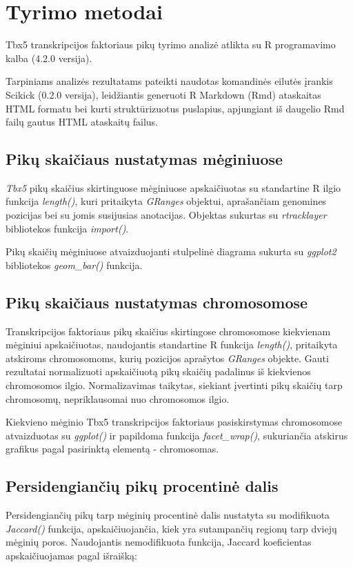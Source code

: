 \documentclass[12pt]{article}
\begin{document}

\section{Tyrimo metodai}
Tbx5 transkripcijos faktoriaus pikų tyrimo analizė atlikta su R programavimo
kalba\cite{R} (4.2.0 versija).

Tarpiniams analizės rezultatams pateikti naudotas komandinės eilutės įrankis
Scikick\cite{SCIK} (0.2.0 versija), leidžiantis generuoti R Markdown (Rmd)
ataskaitas HTML formatu bei kurti struktūrizuotus puslapius, apjungiant
iš daugelio Rmd failų gautus HTML ataskaitų failus.

\subsection{Pikų skaičiaus nustatymas mėginiuose}
\emph{Tbx5} pikų skaičius skirtinguose mėginiuose apskaičiuotas su
standartine R ilgio funkcija \emph{length()}, kuri pritaikyta \emph{GRanges}
objektui, aprašančiam genomines pozicijas bei su jomis susijusias anotacijas.
Objektas sukurtas su \emph{rtracklayer}\cite{R_TRACK} bibliotekos funkcija
\emph{import()}.

Pikų skaičių mėginiuose atvaizduojanti stulpelinė diagrama sukurta su
\emph{ggplot2}\cite{R_GGPLOT} bibliotekos \emph{geom\_bar()} funkcija.

\subsection{Pikų skaičiaus nustatymas chromosomose}
Transkripcijos faktoriaus pikų skaičius skirtingose chromosomose kiekvienam
mėginiui apskaičiuotas, naudojantis standartine R funkcija \emph{length()},
pritaikyta atskiroms chromosomoms, kurių pozicijos aprašytos \emph{GRanges}
objekte. Gauti rezultatai normalizuoti apskaičiuotą pikų skaičių padalinus
iš kiekvienos chromosomos ilgio. Normalizavimas taikytas, siekiant įvertinti
pikų skaičių tarp chromosomų, nepriklausomai nuo chromosomos ilgio.

Kiekvieno mėginio Tbx5 transkripcijos faktoriaus pasiskirstymas
chromosomose atvaizduotas su \emph{ggplot()} ir papildoma funkcija
\emph{facet\_wrap()}, sukuriančia atskirus grafikus pagal pasirinktą elementą -
chromosomas.

\subsection{Persidengiančių pikų procentinė dalis}
Persidengiančių pikų tarp mėginių procentinė dalis nustatyta su modifikuota
\emph{Jaccard()} funkcija, apskaičiuojančia, kiek yra sutampančių regionų tarp
dviejų mėginių poros. Naudojantis nemodifikuota funkcija, Jaccard koeficientas
apskaičiuojamas pagal išraišką:
\end{document}
